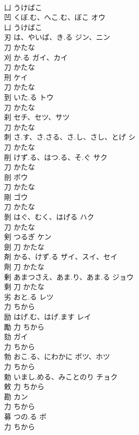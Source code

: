 \documentclass[8pt]{extreport}
\begin{document}
\begin{CJK}{UTF8}{min}
\\	凵		うけばこ		
\\	凹	くぼ.む、へこ.む、ぼこ	オウ	
\\	凵		うけばこ		
\\	刃	は、やいば、き.る	ジン、ニン	
\\	刀		かたな		
\\	刈	か.る	ガイ、カイ	
\\	刀		かたな		
\\	刑		ケイ	
\\	刀		かたな		
\\	到	いた.る	トウ	
\\	刀		かたな		
\\	刹		セチ、セツ、サツ	
\\	刀		かたな		
\\	刺	さ.す、さ.さる、さ.し、さし、とげ	シ	
\\	刀		かたな		
\\	削	けず.る、はつ.る、そ.ぐ	サク	
\\	刀		かたな		
\\	剖		ボウ	
\\	刀		かたな		
\\	剛		ゴウ	
\\	刀		かたな		
\\	剝	はぐ、むく、はげる	ハク		
\\	刀		かたな		
\\	剣	つるぎ	ケン	
\\	劍	刀		かたな		
\\	剤	かる、けず.る	ザイ、スイ、セイ	
\\	劑	刀		かたな		
\\	剰	あまつさえ、あま.り、あま.る	ジョウ	
\\	剩	刀		かたな		
\\	劣	おと.る	レツ	
\\	力		ちから		
\\	励	はげ.む、はげ.ます	レイ	
\\	勵	力		ちから		
\\	劾		ガイ	
\\	力		ちから		
\\	勃	おこ.る、にわかに	ボツ、ホツ	
\\	力		ちから		
\\	勅	いまし.める、みことのり	チョク	
\\	敕	力		ちから		
\\	勘		カン	
\\	力		ちから		
\\	募	つの.る	ボ	
\\	力		ちから		

\end{CJK}
\end{document}
